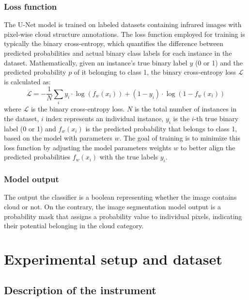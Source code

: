 \documentclass{article}
\begin{document}
\subsubsection{Loss function}

The U-Net model is trained on labeled datasets containing infrared images with pixel-wise cloud structure annotations. The loss function employed for training is typically the binary cross-entropy, which quantifies the difference between predicted probabilities and actual binary class labels for each instance in the dataset. Mathematically, given an instance's true binary label $y$ (0 or 1) and the predicted probability $p$ of it belonging to class 1, the binary cross-entropy loss $\mathcal{L}$ is calculated as:
\begin{equation}
	\mathcal{L} = -\frac{1}{N}\sum_i y_i\cdot\log\left(f_w(x_i)\right) + (1-y_i)\cdot\log\left(1-f_w(x_i)\right)
\end{equation}
where $\mathcal{L}$ is the binary cross-entropy loss. $N$ is the total number of instances in the dataset, $i$ index represents an individual instance, $y_{i}$ is the $i$-th true binary label (0 or 1) and $f_w(x_i)$ is the predicted probability that belongs to class 1, based on the model with parameters $w$.
The goal of training is to minimize this loss function by adjusting the model parameters weights $w$ to better align the predicted probabilities $f_w(x_i)$ with the true labels $y_{i}$.

\subsubsection{Model output}

The output the classifier is a boolean representing whether the image contains cloud or not. On the contrary, the image segmentation model output is a probability mask that assigns a probability value to individual pixels, indicating their potential belonging in the cloud category.

\section{Experimental setup and dataset}

\subsection{Description of the instrument}
\end{document}
